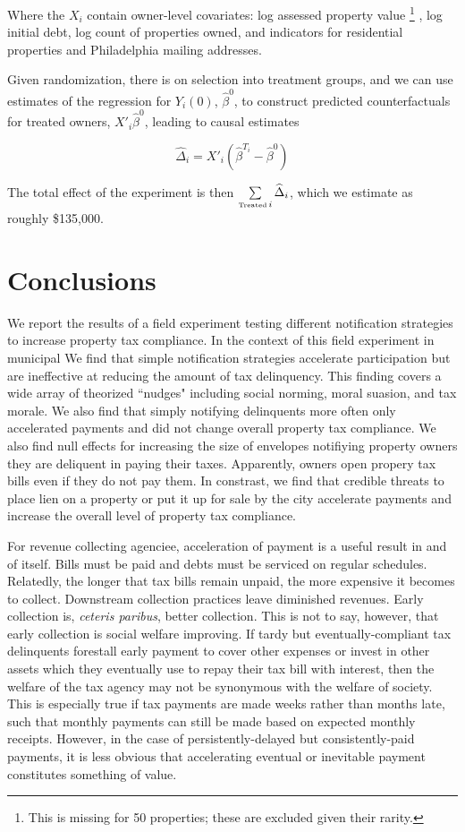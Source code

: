 \documentclass[12pt,titlepage]{article}
\begin{document}
Where the $X_i$ contain owner-level covariates: log assessed
property value
\footnote{
	This is missing for 50 properties; these are excluded
	given their rarity.
}
, log initial debt, log count of properties owned,
and indicators for residential properties and Philadelphia 
mailing addresses. 

Given randomization, there is on selection into treatment groups,
and we can use estimates of the regression for $Y_i(0)$,
$\hat{\beta}^0$, to construct predicted counterfactuals for 
treated owners, $X'_i \hat{\beta}^0$, leading to causal estimates

\[
\widehat{\Delta}_i = X'_i (\hat{\beta}^{T_i} - \hat{\beta}^0)
\]

The total effect of the experiment is then
$\sum\limits_{\mbox{\fontsize{5}{5}\selectfont Treated} \, i} \widehat{\Delta}_i$, which we 
estimate as roughly \$135,000.

\section{Conclusions}

We report the results of a field experiment testing different notification strategies 
to increase property tax compliance. In the context of this field experiment in municipal 
We find that simple notification strategies accelerate participation but are 
ineffective at reducing the amount of tax delinquency. This finding covers a 
wide array of theorized  ``nudges" including social norming, moral suasion, 
and tax morale. We also find that simply notifying delinquents more often only accelerated
payments and did not change overall property tax compliance. We also find null effects for
increasing the size of envelopes notifiying property owners they are deliquent in paying 
their taxes. Apparently, owners open propery tax bills even if they do not pay them.
In constrast, we find that credible threats to place lien on a property or put it up for 
sale by the city accelerate payments and increase the overall level of property tax compliance.  

For revenue collecting agenciee, acceleration of payment is a useful result 
in and of itself. Bills must be paid and debts must be serviced on regular 
schedules. Relatedly, the longer that tax bills remain unpaid, the more 
expensive it becomes to collect. Downstream collection practices leave 
diminished revenues. Early collection is, 
\textit{ceteris paribus}, better collection. This is not to say, 
however, that early collection is social welfare improving. If tardy 
but eventually-compliant tax delinquents forestall early payment to 
cover other expenses or invest in other assets which they eventually 
use to repay their tax bill with interest, then the welfare of the tax 
agency may not be synonymous with the welfare of society. This is 
especially true if tax payments are made weeks rather than months late, 
such that monthly payments can still be made based on expected monthly 
receipts. However, in the case of persistently-delayed but consistently-paid 
payments, it is less obvious that accelerating eventual or inevitable 
payment constitutes something of value. 
\end{document}
